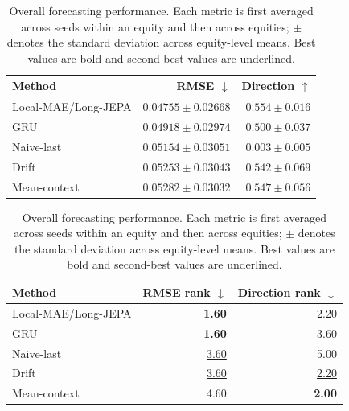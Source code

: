 \begin{table}[t]
\centering
\small
\caption{Overall forecasting performance. Each metric is first averaged across seeds within an equity and then across equities; $\pm$ denotes the standard deviation across equity-level means. Best values are bold and second-best values are underlined.}
\label{tab:main_metrics}
\begin{tabular}{lrr}
\toprule
Method & RMSE $\downarrow$ & Direction $\uparrow$ \\
\midrule
Local-MAE/Long-JEPA & \textbf{$0.04755 \pm 0.02668$} & \textbf{$0.554 \pm 0.016$} \\
GRU & \underline{$0.04918 \pm 0.02974$} & $0.500 \pm 0.037$ \\
Naive-last & $0.05154 \pm 0.03051$ & $0.003 \pm 0.005$ \\
Drift & $0.05253 \pm 0.03043$ & $0.542 \pm 0.069$ \\
Mean-context & $0.05282 \pm 0.03032$ & \underline{$0.547 \pm 0.056$} \\
\bottomrule
\end{tabular}
\par\medskip
\begin{tabular}{lrr}
\toprule
Method & RMSE rank $\downarrow$ & Direction rank $\downarrow$ \\
\midrule
Local-MAE/Long-JEPA & \textbf{1.60} & \underline{2.20} \\
GRU & \textbf{1.60} & 3.60 \\
Naive-last & \underline{3.60} & 5.00 \\
Drift & \underline{3.60} & \underline{2.20} \\
Mean-context & 4.60 & \textbf{2.00} \\
\bottomrule
\end{tabular}
\end{table}

